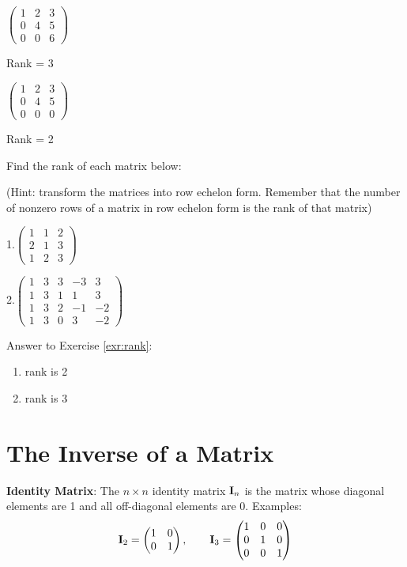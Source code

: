 \documentclass[]{book}
\theoremstyle{definition}
\theoremstyle{definition}
\theoremstyle{definition}
\theoremstyle{remark}
\let\BeginKnitrBlock\begin \let\EndKnitrBlock\end
\begin{document}
\(\begin{pmatrix} 1 & 2 & 3 \\  0 & 4 & 5 \\  0 & 0 & 6 \end{pmatrix}\)

Rank = 3

\(\begin{pmatrix} 1 & 2 & 3 \\ 0 & 4 & 5 \\ 0 & 0 & 0 \end{pmatrix}\)

Rank = 2

\BeginKnitrBlock{exercise}[Rank of Matrices]
\protect\hypertarget{exr:rank}{}{\label{exr:rank} {} }

Find the rank of each matrix below:

(Hint: transform the matrices into row echelon form. Remember that the number of nonzero rows of a matrix in row echelon form is the rank of that matrix)

1.\(\begin{pmatrix} 1 & 1 & 2 \\ 2 & 1 & 3 \\ 1 & 2 & 3 \end{pmatrix}\)

\bigskip

2.\(\begin{pmatrix} 1 & 3 & 3 & -3 & 3\\ 1 & 3 & 1 & 1 & 3 \\ 1 & 3 & 2 & -1 & -2 \\ 1 & 3 & 0 & 3 & -2 \end{pmatrix}\)
\EndKnitrBlock{exercise}

Answer to Exercise \ref{exr:rank}:

\begin{enumerate}
\def\labelenumi{\arabic{enumi}.}
\item
  rank is 2
\item
  rank is 3
\end{enumerate}

\hypertarget{the-inverse-of-a-matrix}{%
\section{The Inverse of a Matrix}\label{the-inverse-of-a-matrix}}

\textbf{Identity Matrix}: The \(n\times n\) identity matrix \({\bf I}_n\) is the matrix whose diagonal elements are 1 and all off-diagonal elements are 0. Examples:
\[ {\bf I}_2=\begin{pmatrix} 1&0\\0&1 \end{pmatrix}, \qquad {\bf I}_3=\begin{pmatrix} 1&0&0\\ 0&1&0\\ 
            0&0&1 \end{pmatrix}\]
\end{document}
